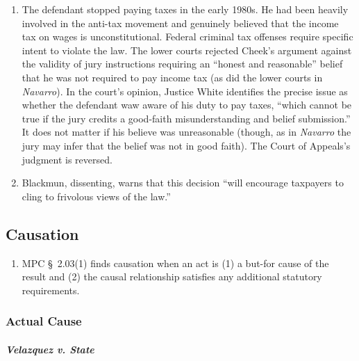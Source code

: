 \begin{enumerate}
    \item The defendant stopped paying taxes in the early 1980s. He had been heavily involved in the anti-tax movement and genuinely believed that the income tax on wages is unconstitutional. Federal criminal tax offenses require specific intent to violate the law. The lower courts rejected Cheek's argument against the validity of jury instructions requiring an ``honest and reasonable'' belief that he was not required to pay income tax (as did the lower courts in \emph{Navarro}). In the court's opinion, Justice White identifies the precise issue as whether the defendant waw aware of his duty to pay taxes, ``which cannot be true if the jury credits a good-faith misunderstanding and belief submission.'' It does not matter if his believe was unreasonable (though, as in \emph{Navarro} the jury may infer that the belief was not in good faith). The Court of Appeals's judgment is reversed.
    \item Blackmun, dissenting, warns that this decision ``will encourage taxpayers to cling to frivolous views of the law.''
\end{enumerate}

\subsection{Causation}

\begin{enumerate}
    \item MPC § 2.03(1) finds causation when an act is (1) a but-for cause of the result and (2) the causal relationship satisfies any additional statutory requirements.%
\end{enumerate}

\subsubsection{Actual Cause}

\paragraph{\emph{Velazquez v. State}}

